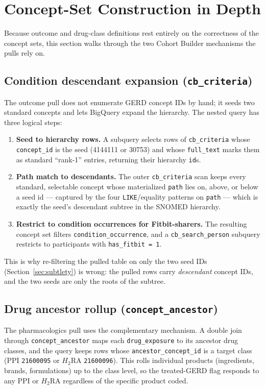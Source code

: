 \documentclass[11pt]{article}
\newcommand{\code}[1]{\texttt{\small #1}}
\begin{document}
\section{Concept-Set Construction in Depth}
Because outcome and drug-class definitions rest entirely on the correctness of the concept sets, this
section walks through the two Cohort Builder mechanisms the pulls rely on.

\subsection{Condition descendant expansion (\code{cb_criteria})}
The outcome pull does not enumerate GERD concept IDs by hand; it seeds two standard concepts and lets
BigQuery expand the hierarchy. The nested query has three logical steps:
\begin{enumerate}[leftmargin=1.5em,itemsep=1pt]
  \item \textbf{Seed to hierarchy rows.} A subquery selects rows of \code{cb_criteria} whose
  \code{concept_id} is the seed (4144111 or 30753) and whose \code{full_text} marks them as standard
  ``rank-1'' entries, returning their hierarchy \code{id}s.
  \item \textbf{Path match to descendants.} The outer \code{cb_criteria} scan keeps every standard,
  selectable concept whose materialized \code{path} lies on, above, or below a seed id --- captured by
  the four \code{LIKE}/equality patterns on \code{path} --- which is exactly the seed's descendant
  subtree in the SNOMED hierarchy.
  \item \textbf{Restrict to condition occurrences for Fitbit-sharers.} The resulting concept set filters
  \code{condition_occurrence}, and a \code{cb_search_person} subquery restricts to participants with
  \code{has_fitbit = 1}.
\end{enumerate}
This is why re-filtering the pulled table on only the two seed IDs (Section~\ref{sec:subtlety}) is wrong:
the pulled rows carry \emph{descendant} concept IDs, and the two seeds are only the roots of the subtree.

\subsection{Drug ancestor rollup (\code{concept_ancestor})}
The pharmacologics pull uses the complementary mechanism. A double join through \code{concept_ancestor}
maps each \code{drug_exposure} to its ancestor drug classes, and the query keeps rows whose
\code{ancestor_concept_id} is a target class (PPI \code{21600095} or $H_2$RA \code{21600096}). This rolls
individual products (ingredients, brands, formulations) up to the class level, so the treated-GERD flag
responds to any PPI or $H_2$RA regardless of the specific product coded.
\end{document}
